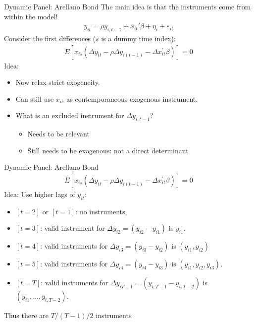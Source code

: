 \documentclass[xcolor=pdftex,dvipsnames,table,mathserif,aspectratio=169]{beamer}
\begin{document}
\begin{frame}{Dynamic Panel: Arellano Bond}
The main idea is that the \alert{instruments come from within the model}!
\begin{eqnarray*}
y_{it} = \rho y_{i,t-1} + x_{it}'\beta + \eta_i + \varepsilon_{it}
\end{eqnarray*}
Consider the first differences ($s$ is a dummy time index):
\begin{eqnarray*}
E\left[x_{i s}\left(\Delta y_{i t}-\rho \Delta y_{i(t-1)}-\Delta x_{i t}^{\prime} \beta\right)\right]=0
\end{eqnarray*}
Idea:
\begin{itemize}
\item Now relax \alert{strict exogeneity}.
\item Can still use $x_{is}$ as contemporaneous exogenous instrument.
\item What is an excluded instrument for $\Delta y_{i,t-1}$?
\begin{itemize}
\item Needs to be \alert{relevant}
\item Still needs to be \alert{exogenous}: not a direct determinant
\end{itemize}
\end{itemize}
\end{frame}

\begin{frame}{Dynamic Panel: Arellano Bond}
\begin{eqnarray*}
E\left[x_{i s}\left(\Delta y_{i t}-\rho \Delta y_{i(t-1)}-\Delta x_{i t}^{\prime} \beta\right)\right]=0
\end{eqnarray*}
Idea: Use higher lags of $y_{it}$:
\begin{itemize}
\item $[t=2]$ or $[t=1]$: no instruments,
\item $[t=3]$:  valid instrument for $\Delta y_{i2} = (y_{i2}-y_{i1})$ is $y_{i1}$.
\item $[t=4]$:  valid instruments for $\Delta y_{i3} = (y_{i3}-y_{i2})$ is $(y_{i1}, y_{i2})$
\item$[t=5]$:  valid instruments for $\Delta y_{i4} = (y_{i4}-y_{i3})$ is $(y_{i1}, y_{i2}, y_{i3})$.
\item$[t=T]$:  valid instruments for $\Delta y_{iT-1} = (y_{i,T-1}-y_{i,T-2})$ is $(y_{i1},\ldots, y_{i,T-2})$.
\end{itemize}
Thus there are $T/(T-1)/2$ instruments
\end{frame}
\end{document}
